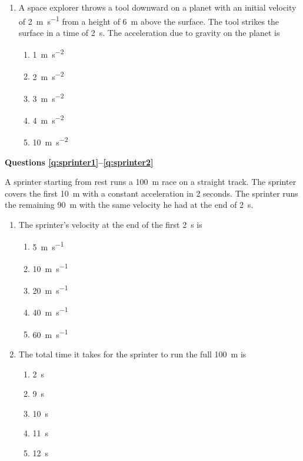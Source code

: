 \documentclass{../../../oss-apphys}
\begin{document}
\begin{multicols}{2}
\begin{enumerate}[leftmargin=18pt]
  \item A space explorer throws a tool downward on a planet with an initial
    velocity of \SI{2}{\metre\per\second} from a height of \SI{6}{\metre}
    above the surface. The
    tool strikes the surface in a time of \SI{2}{\second}. The acceleration due
    to gravity on the planet is
    \begin{enumerate}[nosep,leftmargin=18pt,label=(\Alph*)]
    \item\SI{1}{\metre\per\second\squared}
    \item\SI{2}{\metre\per\second\squared}
    \item\SI{3}{\metre\per\second\squared}
    \item\SI{4}{\metre\per\second\squared}
    \item\SI{10}{\metre\per\second\squared}
    \end{enumerate}
  \end{enumerate}
  \columnbreak

  \textbf{Questions \ref{q:sprinter1}--\ref{q:sprinter2}}
  
  A sprinter starting from rest runs a \SI{100}{\metre} race on a straight
  track. The sprinter covers the first \SI{10}{\metre} with a constant
  acceleration in 2 seconds. The sprinter runs the remaining \SI{90}{\metre}
  with the same velocity he had at the end of \SI{2}{\second}.

  \begin{enumerate}[resume,leftmargin=18pt]
  \item The sprinter's velocity at the end of the first \SI{2}{\second} is
    \begin{enumerate}[nosep,leftmargin=18pt,label=(\Alph*)]
    \item\SI{5 }{\metre\per\second}
    \item\SI{10}{\metre\per\second}
    \item\SI{20}{\metre\per\second}
    \item\SI{40}{\metre\per\second}
    \item\SI{60}{\metre\per\second}
    \end{enumerate}
    \label{q:sprinter1}

  \item The total time it takes for the sprinter to run the full
    \SI{100}{\metre} is
    \begin{enumerate}[nosep,leftmargin=18pt,label=(\Alph*)]
    \item\SI{2 }{\second}
    \item\SI{9 }{\second}
    \item\SI{10}{\second}
    \item\SI{11}{\second}
    \item\SI{12}{\second}
    \end{enumerate}
    \label{q:sprinter2}
    

\end{enumerate}
\end{multicols}
\end{document}
